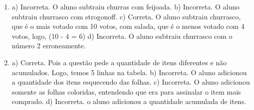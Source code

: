 \begin{enumerate}
\item
a) Incorreta. O aluno subtraiu churras com feijoada.
b) Incorreta. O aluno subtraiu churrasco com strogonoff.
c) Correta. O aluno subtraiu churrasco, que é o mais votado com 10
votos, com salada, que é o menos votado com 4 votos, logo,
(10 - 4 = 6)
d) Incorreta. O aluno subtraiu churrasco com o número 2 erroneamente.

\item
a) Correta. Pois a questão pede a quantidade de itens diferentes e não
acumulados. Logo, temos 5 linhas na tabela.
b) Incorreta. O aluno adicionou a quantidade dos itens esquecendo das
folhas.
c) Incorreta. O aluno adicionou somente as folhas coloridas, entendendo
que era para assinalar o item mais comprado.
d) Incorreta. o aluno adicionou a quantidade acumulada de itens.
\end{enumerate}
